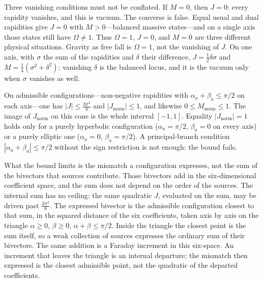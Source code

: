 \documentclass[a4paper]{article}
\newcommand{\Jnorm}{J_{\mathrm{norm}}}
\newcommand{\Mnorm}{M_{\mathrm{norm}}}
\newcommand{\Jbound}{\frac{3\pi^2}{8}}
\begin{document}
Three vanishing conditions must not be conflated. If $M=0$, then $J=0$: every rapidity vanishes, and this is vacuum. The converse is false. Equal usual and dual rapidities give $J=0$ with $M>0$---balanced massive states---and on a single axis those states still have $\Omega\neq 1$. Thus $\Omega=1$, $J=0$, and $M=0$ are three different physical situations. Gravity as free fall is $\Omega=1$, not the vanishing of $J$. On one axis, with $\sigma$ the sum of the rapidities and $\delta$ their difference, $J=\frac12\delta\sigma$ and $M=\frac14(\sigma^2+\delta^2)$: vanishing $\delta$ is the balanced locus, and it is the vacuum only when $\sigma$ vanishes as well.

On admissible configurations---non-negative rapidities with $\alpha_a+\beta_a\le\pi/2$ on each axis---one has $|J|\le\Jbound$ and $|\Jnorm|\le 1$, and likewise $0\le\Mnorm\le 1$. The image of $\Jnorm$ on this cone is the whole interval $[-1,1]$. Equality $|\Jnorm|=1$ holds only for a purely hyperbolic configuration ($\alpha_a=\pi/2$, $\beta_a=0$ on every axis) or a purely elliptic one ($\alpha_a=0$, $\beta_a=\pi/2$). A principal-branch condition $|\alpha_a+\beta_a|\le\pi/2$ without the sign restriction is not enough: the bound fails.

What the bound limits is the mismatch a configuration expresses, not the sum of the bivectors that sources contribute. Those bivectors add in the six-dimensional coefficient space, and the sum does not depend on the order of the sources. The internal sum has no ceiling: the same quadratic $J$, evaluated on the sum, may be driven past $\Jbound$. The expressed bivector is the admissible configuration closest to that sum, in the squared distance of the six coefficients, taken axis by axis on the triangle $\alpha\ge 0$, $\beta\ge 0$, $\alpha+\beta\le\pi/2$. Inside the triangle the closest point is the sum itself, so a weak collection of sources expresses the ordinary sum of their bivectors. The same addition is a Faraday increment in this six-space. An increment that leaves the triangle is an internal departure; the mismatch then expressed is the closest admissible point, not the quadratic of the departed coefficients.
\end{document}
